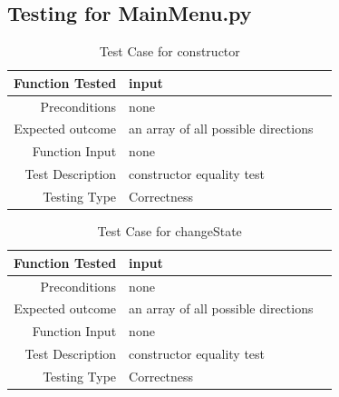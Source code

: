 \documentclass[12pt]{article}
\begin{document}
\subsection{Testing for MainMenu.py}
\begin{center}
	\begin{longtable}{ | r | p{4cm} | p{4cm} }
	\caption{Test Case for constructor} \\ \hline \label{TblInputVar} 
	Function Tested & input\\ \hline
	Preconditions & none \\ \hline
	Expected outcome & an array of all possible directions \\ \hline
	Function Input & none \\ \hline
	Test Description & constructor equality test\\ \hline
	Testing Type & Correctness\\ \hline
	
	\end{longtable}
\end{center}

\begin{center}
	\begin{longtable}{ | r | p{4cm} | p{4cm} }
	\caption{Test Case for changeState} \\ \hline \label{TblInputVar} 
	Function Tested & input\\ \hline
	Preconditions & none \\ \hline
	Expected outcome & an array of all possible directions \\ \hline
	Function Input & none \\ \hline
	Test Description & constructor equality test\\ \hline
	Testing Type & Correctness\\ \hline
	
	\end{longtable}
\end{center}
\end{document}
